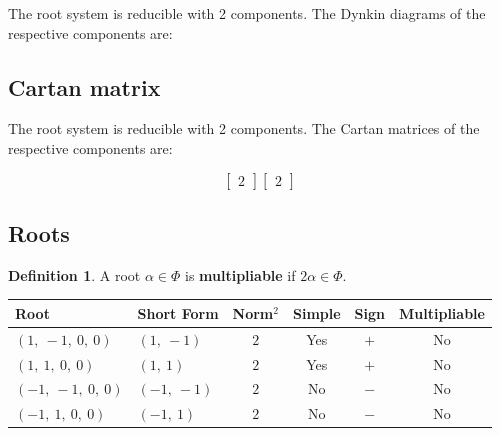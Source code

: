 \documentclass[11pt]{article}
\newcommand{\noi}{\noindent}
\newcommand{\tbf}{\textbf}
\theoremstyle{definition}
\newtheorem{definition}{Definition}[section]
\newif\ifrootsystemirreducible
\begin{document}
\ifrootsystemirreducible
The root system is irreducible and has Dynkin diagram:
\else
The root system is reducible with 2 components. The Dynkin diagrams of the respective components are:
\fi

 \begin{center}
\end{center} \begin{center}
\end{center}

\subsection{Cartan matrix}

\ifrootsystemirreducible
The root system is irreducible and has Cartan matrix:
\else
The root system is reducible with 2 components. The Cartan matrices of the respective components are:
\fi

\[
 \left[\begin{matrix}2\end{matrix}\right] \left[\begin{matrix}2\end{matrix}\right]
\]

\subsection{Roots}

\begin{definition}
A root $\alpha \in \Phi$ is \tbf{multipliable} if $2\alpha \in \Phi$.
\end{definition}

\noi \begin{tabular}{|l|l|c|c|c|c|}
    \hline
    \textbf{Root} & \textbf{Short Form} & \textbf{Norm$^2$} & \textbf{Simple} & \textbf{Sign} & \textbf{Multipliable} \\
    \hline
    $\left( 1, \  -1, \  0, \  0\right)$ & $\left( 1, \  -1\right)$ & $2$ & Yes & $+$ & No \\
    \hline
    $\left( 1, \  1, \  0, \  0\right)$ & $\left( 1, \  1\right)$ & $2$ & Yes & $+$ & No \\
    \hline
    $\left( -1, \  -1, \  0, \  0\right)$ & $\left( -1, \  -1\right)$ & $2$ & No & $-$ & No \\
    \hline
    $\left( -1, \  1, \  0, \  0\right)$ & $\left( -1, \  1\right)$ & $2$ & No & $-$ & No \\
    \hline
\end{tabular}
\end{document}

